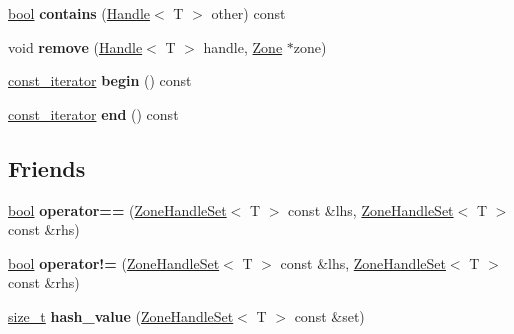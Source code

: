 \begin{DoxyCompactItemize}
\item 
\mbox{\label{classv8_1_1internal_1_1ZoneHandleSet_a9ac6edb8107665442187d036423bc3fd}} 
\mbox{\hyperlink{classbool}{bool}} {\bfseries contains} (\mbox{\hyperlink{classv8_1_1internal_1_1Handle}{Handle}}$<$ T $>$ other) const
\item 
\mbox{\label{classv8_1_1internal_1_1ZoneHandleSet_adff397434390476a77af8a8e83b4f0cd}} 
void {\bfseries remove} (\mbox{\hyperlink{classv8_1_1internal_1_1Handle}{Handle}}$<$ T $>$ handle, \mbox{\hyperlink{classv8_1_1internal_1_1Zone}{Zone}} $\ast$zone)
\item 
\mbox{\label{classv8_1_1internal_1_1ZoneHandleSet_a5d77a0710da65159e18ca63ee062d93f}} 
\mbox{\hyperlink{classv8_1_1internal_1_1ZoneHandleSet_1_1const__iterator}{const\+\_\+iterator}} {\bfseries begin} () const
\item 
\mbox{\label{classv8_1_1internal_1_1ZoneHandleSet_a4a474e991bb9c01c304f49f5be60b8d4}} 
\mbox{\hyperlink{classv8_1_1internal_1_1ZoneHandleSet_1_1const__iterator}{const\+\_\+iterator}} {\bfseries end} () const
\end{DoxyCompactItemize}
\subsection*{Friends}
\begin{DoxyCompactItemize}
\item 
\mbox{\label{classv8_1_1internal_1_1ZoneHandleSet_a797e58a81e08330c12731ff1c9f0feae}} 
\mbox{\hyperlink{classbool}{bool}} {\bfseries operator==} (\mbox{\hyperlink{classv8_1_1internal_1_1ZoneHandleSet}{Zone\+Handle\+Set}}$<$ T $>$ const \&lhs, \mbox{\hyperlink{classv8_1_1internal_1_1ZoneHandleSet}{Zone\+Handle\+Set}}$<$ T $>$ const \&rhs)
\item 
\mbox{\label{classv8_1_1internal_1_1ZoneHandleSet_aed80f29193132e393b805e39cb5975dc}} 
\mbox{\hyperlink{classbool}{bool}} {\bfseries operator!=} (\mbox{\hyperlink{classv8_1_1internal_1_1ZoneHandleSet}{Zone\+Handle\+Set}}$<$ T $>$ const \&lhs, \mbox{\hyperlink{classv8_1_1internal_1_1ZoneHandleSet}{Zone\+Handle\+Set}}$<$ T $>$ const \&rhs)
\item 
\mbox{\label{classv8_1_1internal_1_1ZoneHandleSet_ad508fe67fdf995c8000db1e29d6a51a8}} 
\mbox{\hyperlink{classsize__t}{size\+\_\+t}} {\bfseries hash\+\_\+value} (\mbox{\hyperlink{classv8_1_1internal_1_1ZoneHandleSet}{Zone\+Handle\+Set}}$<$ T $>$ const \&set)
\end{DoxyCompactItemize}


